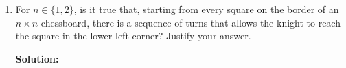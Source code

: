 \documentclass[11pt]{article}
\begin{document}
\begin{enumerate}
\begin{enumerate}
\begin{solution}
{\bf Solution:}\\
Use postage stamp problem
\end{solution}

\item
\begin{question}
For $n \in \{1,2\}$, is it true that, starting from every square on the border of an $n \times n$ chessboard, there is a sequence of turns
that allows the knight to reach the square in the lower left corner? Justify your answer.
\end{question}

\begin{solution}
{\bf Solution:}\\

\end{solution}
\end{enumerate}
\end{enumerate}
\end{document}
